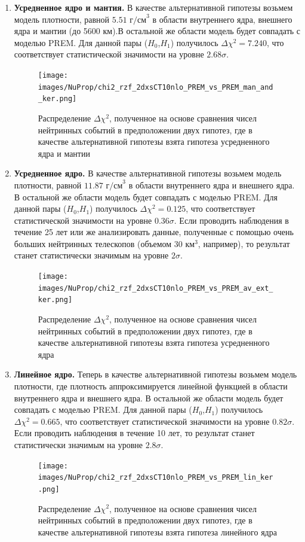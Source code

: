 \begin{enumerate}
    \item \textbf{Усредненное ядро и мантия.} В качестве альтернативной гипотезы возьмем модель плотности, равной $5.51\text{ г/см}^3$ в области внутреннего ядра, внешнего ядра и мантии (до 5600 км).В остальной же области модель будет совпадать с моделью PREM. Для данной пары ($H_0$,$H_1$) получилось $\Delta\chi^2 = 7.240$, что соответствует статистической значимости на уровне $2.68\sigma$.   
    \begin{figure}[!h]
    \centering
    \texttt{[image: images/NuProp/chi2\_rzf\_2dxsCT10nlo\_PREM\_vs\_PREM\_man\_and\_ker.png]}
    \caption{Распределение $\Delta\chi^2$, полученное на основе сравнения чисел нейтринных событий в предположении двух гипотез, где в качестве альтернативной гипотезы взята гипотеза усредненного ядра и мантии}
    \label{NuTom1}
    \end{figure}
    \item \textbf{Усредненное ядро.} В качестве альтернативной гипотезы возьмем модель плотности, равной $11.87\text{ г/см}^3$ в области внутреннего ядра и внешнего ядра. В остальной же области модель будет совпадать с моделью PREM. Для данной пары ($H_0$,$H_1$) получилось $\Delta\chi^2 = 0.125$, что соответствует статистической значимости на уровне $0.36\sigma$. Если проводить наблюдения в течение 25 лет или же анализировать данные, полученные с помощью очень больших нейтринных телескопов (объемом $30 \text{ км}^3$, например), то результат станет статистически значимым на уровне $2\sigma$.   
    \begin{figure}[!h]
    \centering
    \texttt{[image: images/NuProp/chi2\_rzf\_2dxsCT10nlo\_PREM\_vs\_PREM\_av\_ext\_ker.png]}
    \caption{Распределение $\Delta\chi^2$, полученное на основе сравнения чисел нейтринных событий в предположении двух гипотез, где в качестве альтернативной гипотезы взята гипотеза усредненного ядра}
    \label{NuTom2}
    \end{figure}
    \item \textbf{Линейное ядро.} Теперь в качестве альтернативной гипотезы возьмем модель плотности,  где плотность аппроксимируется линейной функцией в области внутреннего ядра и внешнего ядра. В остальной же области модель будет совпадать с моделью PREM. Для данной пары ($H_0$,$H_1$) получилось $\Delta\chi^2 = 0.665$, что соответствует статистической значимости на уровне $0.82\sigma$. Если проводить наблюдения в течение 10 лет, то результат станет статистически значимым на уровне $2.8\sigma$. 
    \begin{figure}[!h]
    \centering
    \texttt{[image: images/NuProp/chi2\_rzf\_2dxsCT10nlo\_PREM\_vs\_PREM\_lin\_ker.png]}
    \caption{Распределение $\Delta\chi^2$, полученное на основе сравнения чисел нейтринных событий в предположении двух гипотез, где в качестве альтернативной гипотезы взята гипотеза линейного ядра}
    \label{NuTom3}
    \end{figure}
\end{enumerate}
